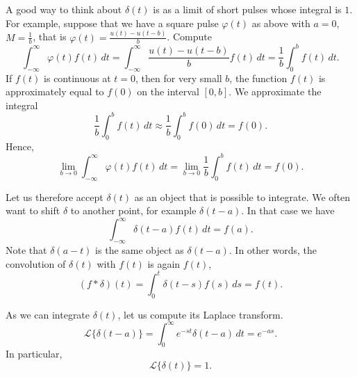 \documentclass{ximera}
\begin{document}
A good way to think about $\delta(t)$ is as a limit of short pulses whose integral is $1$.  For example, suppose that we have a square pulse $\varphi(t)$ as above with $a=0$, $M=\frac{1}{b}$, that is $\varphi(t) = \frac{u(t) - u(t-b)}{b}$. Compute
\begin{equation*}
    \int_{-\infty}^\infty \varphi(t) f(t) \,dt = \int_{-\infty}^\infty \frac{u(t) - u(t-b)}{b} f(t) \,dt = \frac{1}{b} \int_{0}^b f(t) \,dt .
\end{equation*}
If $f(t)$ is continuous at $t=0$, then for very small $b$, the function $f(t)$ is approximately equal to $f(0)$ on the interval $[0,b]$.  We approximate the integral
\begin{equation*}
    \frac{1}{b} \int_{0}^b f(t) \,dt \approx \frac{1}{b} \int_{0}^b f(0) \,dt = f(0) .
\end{equation*}
Hence,
\begin{equation*}
    \lim_{b\to 0} \int_{-\infty}^\infty \varphi(t) f(t) \,dt = \lim_{b\to 0} \frac{1}{b} \int_{0}^b f(t) \,dt  = f(0) .
\end{equation*}

Let us therefore accept $\delta(t)$ as an object that is possible to integrate.  We often want to shift $\delta$ to another point, for example $\delta(t-a)$.  In that case we have
\begin{equation*}
    \int_{-\infty}^\infty \delta(t-a) f(t) \,dt = f(a) .
\end{equation*}
Note that $\delta(a-t)$ is the same object as $\delta(t-a)$. In other words, the convolution of $\delta(t)$ with $f(t)$ is again $f(t)$,
\begin{equation*}
    (f * \delta) (t) = \int_{0}^t \delta(t-s) f(s) \,ds = f(t) .
\end{equation*}

As we can integrate $\delta(t)$, let us compute its Laplace transform.
\begin{equation*}
    {\mathcal{L}} \bigl\{ \delta(t-a) \bigr\} = \int_{0}^\infty e^{-st} \delta(t-a) \,dt = e^{-as} .
\end{equation*}
In particular,
\begin{equation*}
    {\mathcal{L}} \bigl\{ \delta(t) \bigr\} = 1 .
\end{equation*}
\end{document}
